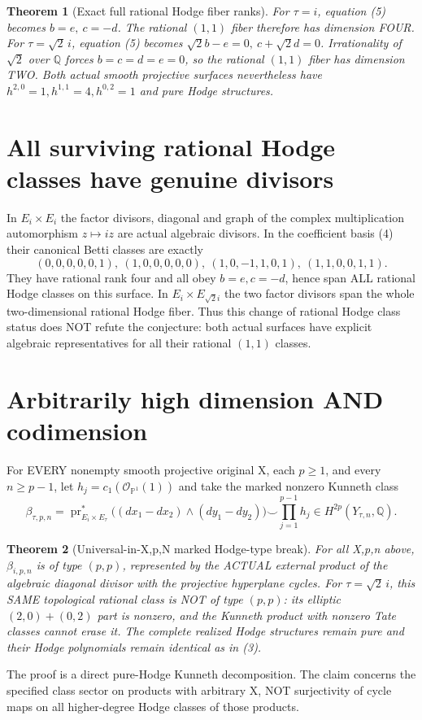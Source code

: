 \documentclass[11pt]{article}
\newtheorem{theorem}{Theorem}
\begin{document}
\begin{theorem}[Exact full rational Hodge fiber ranks]
For $\tau=i$, equation (5) becomes $b=e,\ c=-d$.
The rational $(1,1)$ fiber therefore has dimension FOUR.
For $\tau=\sqrt2\,i$, equation (5) becomes
$\sqrt2 b-e=0,\ c+\sqrt2d=0$. Irrationality of
$\sqrt2$ over $\mathbb Q$ forces $b=c=d=e=0$,
so the rational $(1,1)$ fiber has dimension TWO.
Both actual smooth projective surfaces nevertheless have
$h^{2,0}=1,h^{1,1}=4,h^{0,2}=1$ and pure Hodge structures.
\end{theorem}

\section{All surviving rational Hodge classes have genuine divisors}
In $E_i\times E_i$ the factor divisors, diagonal and
graph of the complex multiplication automorphism $z\mapsto iz$ are actual algebraic divisors. In the coefficient basis (4) their canonical Betti classes are exactly
\[
 (0,0,0,0,0,1),\ (1,0,0,0,0,0),\
 (1,0,-1,1,0,1),\ (1,1,0,0,1,1).                         \tag{6}
\]
They have rational rank four and all obey $b=e,c=-d$,
hence span ALL rational Hodge classes on this surface.
In $E_i\times E_{\sqrt2 i}$ the two factor divisors span
the whole two-dimensional rational Hodge fiber.
Thus this change of rational Hodge class status does NOT
refute the conjecture: both actual surfaces have explicit algebraic representatives for all their rational $(1,1)$ classes.

\section{Arbitrarily high dimension AND codimension}
For EVERY nonempty smooth projective original X, each $p\ge1$,
and every $n\ge p-1$, let $h_j=c_1(\mathcal O_{\mathbb P^1}(1))$
and take the marked nonzero Kunneth class
\[
 \beta_{\tau,p,n}=
  \operatorname{pr}_{E_i\times E_\tau}^*
  \bigl((dx_1-dx_2)\wedge(dy_1-dy_2)\bigr)
    \smile\prod_{j=1}^{p-1}h_j
       \in H^{2p}(Y_{\tau,n},\mathbb Q).                    \tag{7}
\]
\begin{theorem}[Universal-in-X,p,N marked Hodge-type break]
For all X,p,n above, $\beta_{i,p,n}$ is of type $(p,p)$,
represented by the ACTUAL external product of the algebraic
diagonal divisor with the projective hyperplane cycles.
For $\tau=\sqrt2\,i$, this SAME topological rational class
is NOT of type $(p,p)$: its elliptic $(2,0)+(0,2)$
part is nonzero, and the Kunneth product with nonzero
Tate classes cannot erase it. The complete realized
Hodge structures remain pure and their Hodge
polynomials remain identical as in (3).
\end{theorem}
The proof is a direct pure-Hodge Kunneth decomposition.
The claim concerns the specified class sector on
products with arbitrary X, NOT surjectivity of cycle maps
on all higher-degree Hodge classes of those products.
\end{document}
